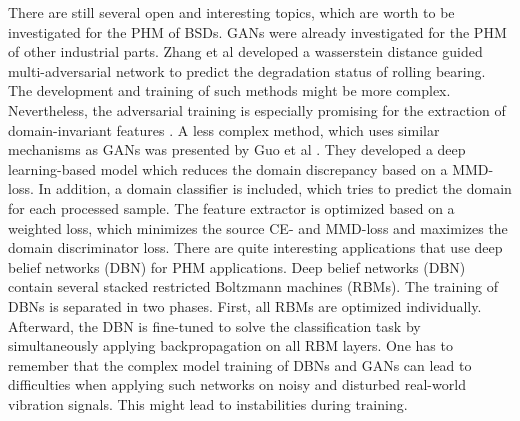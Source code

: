 There are still several open and interesting topics, which are worth to be investigated for the PHM of BSDs. GANs were already investigated for the PHM of other industrial parts. Zhang et al \cite{Zhang2019} developed a wasserstein distance guided multi-adversarial network to predict the degradation status of rolling bearing. The development and training of such methods might be more complex. Nevertheless, the adversarial training is especially promising for the extraction of domain-invariant features \cite{Zhang2019}. A less complex method, which uses similar mechanisms as GANs was presented by Guo et al \cite{Guo2019}. They developed a deep learning-based model which reduces the domain discrepancy based on a MMD-loss. In addition, a domain classifier is included, which tries to predict the domain for each processed sample. The feature extractor is optimized based on a weighted loss, which minimizes the source CE- and MMD-loss and maximizes the domain discriminator loss. There are quite interesting applications that use deep belief networks (DBN) \cite{ZHAO2019213} for PHM applications. Deep belief networks (DBN) contain several stacked restricted Boltzmann machines (RBMs). The training of DBNs is separated in two phases. First, all RBMs are optimized individually. Afterward, the DBN is fine-tuned to solve the classification task by simultaneously applying backpropagation on all RBM layers. One has to remember that the complex model training of DBNs and GANs can lead to difficulties when applying such networks on noisy and disturbed real-world vibration signals. This might lead to instabilities during training.





\begin{comment}
Also the preprocessing of the recorded machine signals could be improved. In this thesis a simple windowing function was used to separate the data in shorter sequences. Generally, the generated windows should capture the degradation related patterns of the vibration signals. For this reason, the windows should be adjusted to the consistency and periodicity of the data. The windowing requirements differ for the machine excitements (constant speed excitement, direction change excitement and sweep excitement). Generally, when choosing the window size, there is a trade-off between the window size and the number of windows generated from the data. Both extremes (few big windows and numerous small windows) might lead to problems during the training. The PHM results might be improved by applying an adaptive preprocessing to generate data windows of suitable length, which are well synchronized with the data. Lastly, also the potential performance gains due to the combination of several signals could be investigated in more detail.
\end{comment}